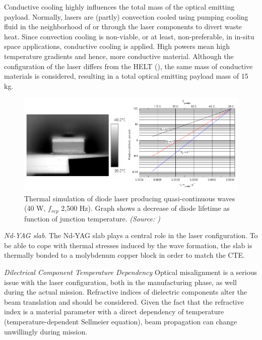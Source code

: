Conductive cooling highly influences the total mass of the optical emitting payload. Normally, \acp{laser} are (partly) convection cooled using pumping cooling fluid in the neighborhood of or through the \acs{laser} components to divert waste heat. Since convection cooling is non-viable, or at least, non-preferable, in in-situ space applications, conductive cooling is applied. High powers mean high temperature gradients and hence, more conductive material. Although the configuration of the \acs{laser} differs from the HELT (\cite{nd_yag_life}), the same mass of conductive materials is considered, resulting in a total optical emitting payload mass of 15 kg. 

\begin{figure}[ht!]
\centering
\includegraphics[scale=0.5]{chapters/img/diode_thermal.png} 
\caption{Thermal simulation of diode laser producing quasi-continuous waves (40 W, $f_{rep}$ 2,500 Hz). Graph shows a decrease of diode lifetime as function of junction temperature. \emph{(Source: \cite{thermaldiode})}}
\label{thermal_control}
\end{figure}

\textit{\acs{Nd-YAG} slab}. 
The \acs{Nd-YAG} slab plays a central role in the \acs{laser} configuration. To be able to cope with thermal stresses induced by the wave formation, the slab is thermally bonded to a molybdenum copper block in order to match the CTE.

\textit{Dilectrical Component Temperature Dependency}
Optical misalignment is a serious issue  with the \acs{laser} configuration, both in the manufacturing phase, as well during the actual mission. Refractive indices of dielectric components alter the beam translation and should be considered. Given the fact that the refractive index is a material parameter with a direct dependency of temperature (temperature-dependent Sellmeier equation), beam propagation can change unwillingly during mission. 


